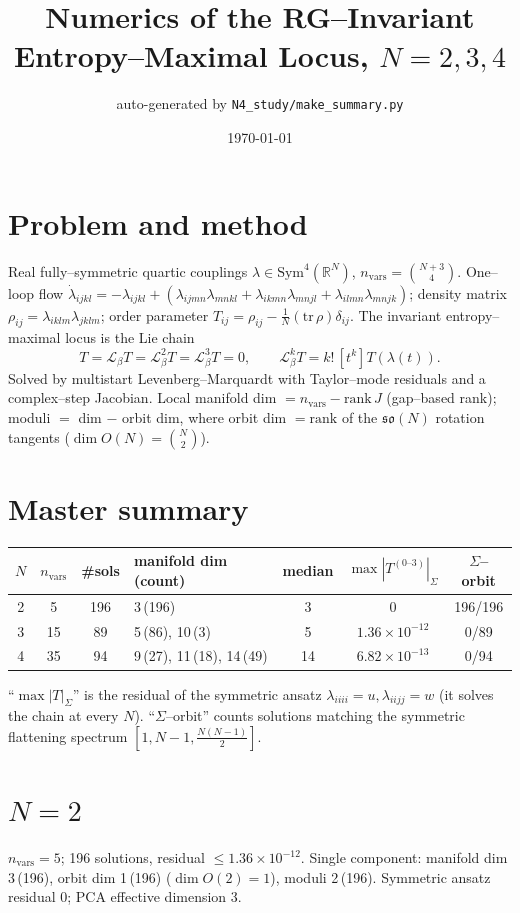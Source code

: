 \documentclass[11pt]{article}
\title{Numerics of the RG--Invariant Entropy--Maximal Locus, $N=2,3,4$}
\author{auto-generated by \texttt{N4\_study/make\_summary.py}}
\date{\today}
\begin{document}
\maketitle
\section{Problem and method}
Real fully--symmetric quartic couplings $\lambda\in\mathrm{Sym}^4(\mathbb R^N)$, $n_{\mathrm{vars}}=\binom{N+3}{4}$. One--loop flow $\dot\lambda_{ijkl}=-\lambda_{ijkl}+(\lambda_{ijmn}\lambda_{mnkl}+\lambda_{ikmn}\lambda_{mnjl}+\lambda_{ilmn}\lambda_{mnjk})$; density matrix $\rho_{ij}=\lambda_{iklm}\lambda_{jklm}$; order parameter $T_{ij}=\rho_{ij}-\tfrac1N(\mathrm{tr}\,\rho)\delta_{ij}$. The invariant entropy--maximal locus is the Lie chain
\[ T=\mathcal L_\beta T=\mathcal L_\beta^2 T=\mathcal L_\beta^3 T=0,\qquad \mathcal L_\beta^k T=k!\,[t^k]T(\lambda(t)). \]
Solved by multistart Levenberg--Marquardt with Taylor--mode residuals and a complex--step Jacobian. Local manifold dim $=n_{\mathrm{vars}}-\mathrm{rank}\,J$ (gap--based rank); moduli $=$ dim $-$ orbit dim, where orbit dim $=\mathrm{rank}$ of the $\mathfrak{so}(N)$ rotation tangents ($\dim O(N)=\binom N2$).
\section{Master summary}
\begin{center}\begin{tabular}{ccclccc}\toprule
$N$ & $n_{\mathrm{vars}}$ & \#sols & manifold dim (count) & median & $\max|T^{(0\text{--}3)}|_\Sigma$ & $\Sigma$--orbit \\ \midrule
2 & 5 & 196 & 3\,(196) & 3 & $0$ & 196/196 \\
3 & 15 & 89 & 5\,(86), 10\,(3) & 5 & $1.36\times10^{-12}$ & 0/89 \\
4 & 35 & 94 & 9\,(27), 11\,(18), 14\,(49) & 14 & $6.82\times10^{-13}$ & 0/94 \\
\bottomrule\end{tabular}\end{center}
\noindent ``$\max|T|_\Sigma$'' is the residual of the symmetric ansatz $\lambda_{iiii}{=}u,\lambda_{iijj}{=}w$ (it solves the chain at every $N$). ``$\Sigma$--orbit'' counts solutions matching the symmetric flattening spectrum $[1,N{-}1,\tfrac{N(N-1)}2]$.
\section{$N=2$}
$n_{\mathrm{vars}}=5$; 196 solutions, residual $\le1.36\times10^{-12}$. Single component: manifold dim 3\,(196), orbit dim 1\,(196) ($\dim O(2)=1$), moduli 2\,(196). Symmetric ansatz residual $0$; PCA effective dimension 3.
\end{document}
